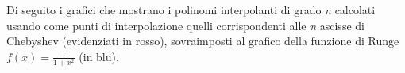 \begin{center}
\footnotesize\noindent{}\end{center}

\noindent Di seguito i grafici che mostrano i polinomi interpolanti di grado \textit{n} calcolati usando come punti di interpolazione quelli corrispondenti alle \textit{n} ascisse di Chebyshev (evidenziati in rosso), sovraimposti al grafico della funzione di Runge \(f(x) = \frac{1}{1+x^2}\) (in blu). \\

